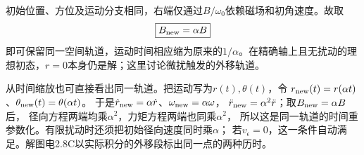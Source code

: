 \documentclass[UTF8,fontset=fandol,a4paper,11pt]{ctexart}
\newcommand{\result}[1]{\begin{equation*}\boxed{#1}\end{equation*}}
\begin{document}
初始位置、方位及运动分支相同，右端仅通过$B/\omega_0$依赖磁场和初角速度。故取
\result{B_{\rm new}=\alpha B}
即可保留同一空间轨道，运动时间相应缩为原来的$1/\alpha$。在精确轴上且无扰动的理想初态，$r=0$本身仍是解；这里讨论微扰触发的外移轨道。

从时间缩放也可直接看出同一轨道。把运动写为$r(t),\theta(t)$，令
$r_{\rm new}(t)=r(\alpha t)$、$\theta_{\rm new}(t)=\theta(\alpha t)$。
于是$\dot r_{\rm new}=\alpha\dot r$、$\omega_{\rm new}=\alpha\omega$，
$\ddot r_{\rm new}=\alpha^2\ddot r$；取$B_{\rm new}=\alpha B$后，
径向方程两端均乘$\alpha^2$，力矩方程两端也同乘$\alpha^2$，
所以这是同一轨道的时间重参数化。有限扰动时还须把初始径向速度同时乘$\alpha$；
若$v_\epsilon=0$，这一条件自动满足。解图电2.8C以实际积分的外移段标出同一点的两种历时。
\begin{center}\begin{minipage}{.97\linewidth}\centering
{}
\end{minipage}
\end{center}
\end{document}
